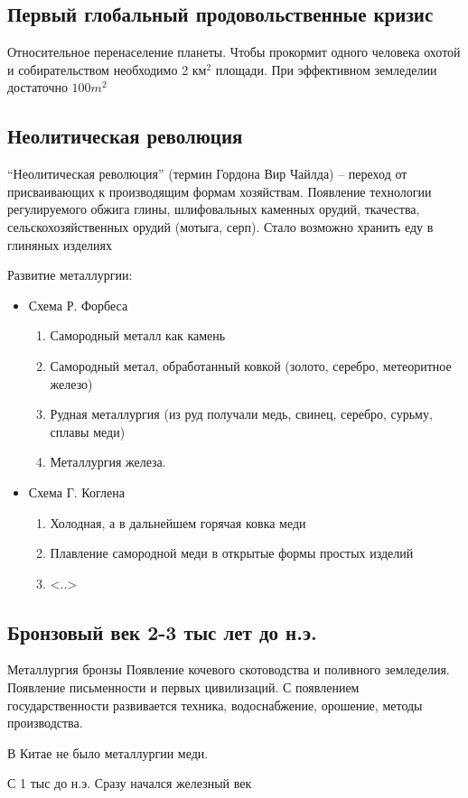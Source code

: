 \documentclass{book}
\theoremstyle{definition}
\begin{document}
    \subsection{Первый глобальный продовольственные кризис}

    Относительное перенаселение планеты. Чтобы прокормит одного человека охотой и собирательством необходимо 2 км${}^2$ площади. При эффективном земледелии достаточно $100m^2$

    \subsection{Неолитическая революция}

    ``Неолитическая революция'' (термин Гордона Вир Чайлда) -- переход от присваивающих к производящим формам хозяйствам. Появление технологии регулируемого обжига глины, шлифовальных каменных орудий, ткачества, сельскохозяйственных орудий (мотыга, серп). Стало возможно хранить еду в глиняных изделиях

    Развитие металлургии:
    \begin{itemize}
        \item Схема Р. Форбеса
            \begin{enumerate}
                \item Самородный металл как камень
                \item Самородный метал, обработанный ковкой (золото, серебро, метеоритное железо)
                \item Рудная металлургия (из руд получали медь, свинец, серебро, сурьму, сплавы меди)
                \item Металлургия железа.
            \end{enumerate}
        \item Схема Г. Коглена
            \begin{enumerate}
                \item Холодная, а в дальнейшем горячая ковка меди
                \item Плавление самородной меди в открытые формы простых изделий
                \item <..>
            \end{enumerate}
    \end{itemize}

    \subsection{Бронзовый век 2-3 тыс лет до н.э.}

    Металлургия бронзы Появление кочевого скотоводства и поливного земледелия. Появление письменности и первых цивилизаций. С появлением государственности развивается техника, водоснабжение, орошение, методы производства.

    В Китае не было металлургии меди.

    С 1 тыс до н.э. Сразу начался железный век
\end{document}
